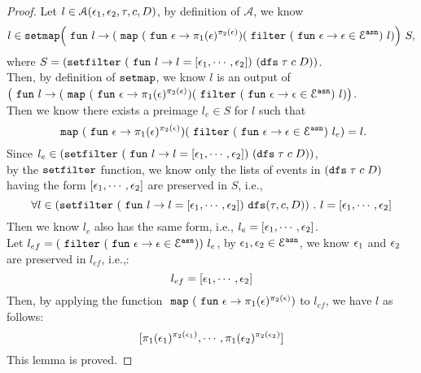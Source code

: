 \begin{proof}
Let  $l \in \mathcal{A}(\mathtt{\epsilon}_1, \mathtt{\epsilon}_2, \mathtt{\tau}, c, D)$,
by definition of $\mathcal{A}$, we know 
%
$$l\in \kw{setmap} 
		\left(\efun l \to ( \emap 
		(\efun  \event \to \pi_1(\event)^{\pi_2(\event)})
	(\efilter 
		(\efun \event \to  \event \in \eventset^{\asn}) ~ l) \right)
	~ S,
$$
%
where $S=(\mathtt{setfilter} ~(~\mathtt{fun}~ l \to l = [\mathtt{\epsilon}_1, \cdots, \mathtt{\epsilon}_2]) ~ (\mathtt{dfs} \; \mathtt{\tau} \; c \;  D))$.
\\
Then, by definition of $\mathtt{setmap}$, we know $l$ is an output of
\\
$\left(\efun l \to ( \emap 
		(\efun  \event \to \pi_1(\event)^{\pi_2(\event)})
	(\efilter 
		(\efun \event \to  \event \in \eventset^{\asn}) ~ l) \right)$.
\\
Then we know there exists a preimage
$l_e \in S $
for $l$ such that 
$$
~\mathtt{map}~ (~\mathtt{fun}~  \mathtt{\epsilon} \to \pi_1(\mathtt{\epsilon})^{\pi_2(\mathtt{\epsilon})}) 
(~\mathtt{filter}~ (~\mathtt{fun}~ \mathtt{\epsilon} \to  \mathtt{\epsilon} \in \mathcal{E}^{\mathtt{{asn}}}) ~ l_e) 
= l.
$$
Since $l_e \in (\mathtt{setfilter} ~(~\mathtt{fun}~ l \to l = [\mathtt{\epsilon}_1, \cdots, \mathtt{\epsilon}_2]) ~ (\mathtt{dfs} \; \mathtt{\tau} \; c \;  D))$,
\\
by the $\mathtt{setfilter}$ function,
we know only the lists of events in $(\mathtt{dfs} \; \mathtt{\tau} \; c \;  D)$ having the form
$ [\mathtt{\epsilon}_1, \cdots, \mathtt{\epsilon}_2] $ are preserved in $S$, i.e.,
\[
	\forall l \in (\mathtt{setfilter} ~(~\mathtt{fun}~ l \to l = [\mathtt{\epsilon}_1, \cdots, \mathtt{\epsilon}_2]) ~ \mathtt{dfs}(\mathtt{\tau}, c, D))
	~.~ l = [\mathtt{\epsilon}_1, \cdots, \mathtt{\epsilon}_2]
\]
%
Then we know $l_e$ also has the same form, 
i.e., $l_e = [\mathtt{\epsilon}_1, \cdots, \mathtt{\epsilon}_2]$.
%
\\
Let $l_{ef} = (~\mathtt{filter}~ (~\mathtt{fun}~ \mathtt{\epsilon} \to  \mathtt{\epsilon} \in \mathcal{E}^{\mathtt{{asn}}})) ~ l_e$, 
by $\mathtt{\epsilon}_1, \mathtt{\epsilon}_2 \in \mathcal{E}^{\mathtt{{asn}}}$, 
we know $\mathtt{\epsilon}_1$ and $\mathtt{\epsilon}_2$ are preserved in $l_{ef}$, i.e.,:
\[
	l_{ef} =[\mathtt{\epsilon}_1, \cdots, \mathtt{\epsilon}_2]
\]
%
Then, by applying the function
$~\mathtt{map}~ (~\mathtt{fun}~  \mathtt{\epsilon} \to \pi_1(\mathtt{\epsilon})^{\pi_2(\mathtt{\epsilon})})$ to 
$l_{ef}$, we have $l$ as follows:
\[
	[\pi_1(\mathtt{\epsilon}_1)^{\pi_2(\mathtt{\epsilon}_1)}, \cdots, \pi_1(\mathtt{\epsilon}_2)^{\pi_2(\mathtt{\epsilon}_2)}]
\]
%
%
This lemma is proved.
\end{proof}
